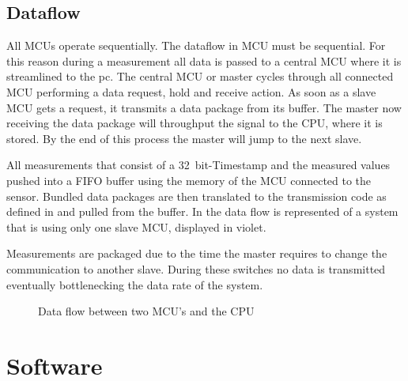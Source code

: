 



\subsection{Dataflow}

All \acs{MCU}s operate sequentially.
The dataflow in \ac{MCU} must be sequential. For this reason during a measurement all data is passed to a central \ac{MCU} where it is streamlined to the pc. The central \ac{MCU} or master cycles through all connected \ac{MCU} performing a data request, hold and receive action. As soon as a slave \ac{MCU} gets a request, it transmits a data package from its buffer. The master now receiving the data package will throughput the signal to the \ac{CPU}, where it is stored. By the end of this process the master will jump to the next slave.

All measurements that consist of a \SI{32}{bit}-Timestamp and the measured values pushed into a \ac{FIFO} buffer using the memory of the \ac{MCU} connected to the sensor. Bundled data packages are then translated to the transmission code as defined in  and pulled from the buffer. In  the data flow is represented of a system that is using only one slave \ac{MCU}, displayed in violet.

Measurements are packaged due to the time the master requires to change the communication to another slave. During these switches no data is transmitted eventually bottlenecking the data rate of the system.

\begin{figure}[!htb]
    \centering
    
    \caption[Data flow]{Data flow between two MCU's and the CPU}
    \label{fig:data_flow}
\end{figure}

\section{Software}

